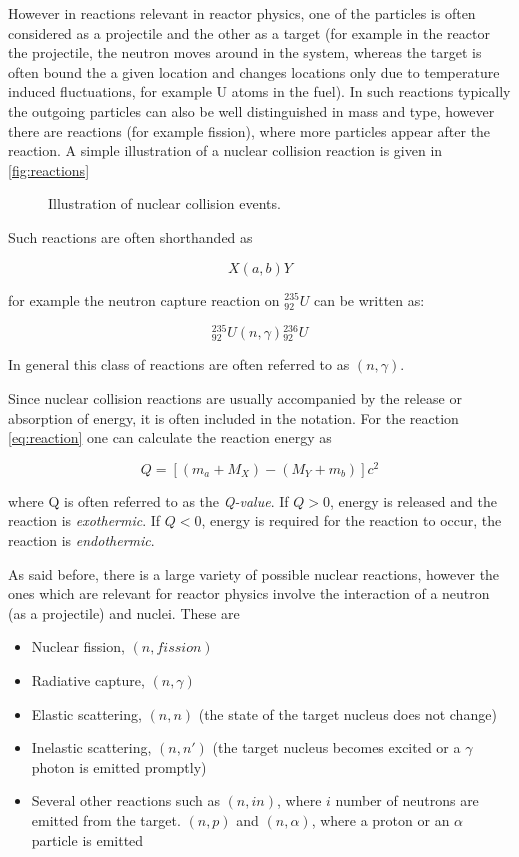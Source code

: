 However in reactions relevant in reactor physics, one of the particles is often considered as a projectile and the other as a target (for example in the reactor the projectile, the neutron moves around in the system, whereas the target is often bound the a given location and changes locations only due to temperature induced fluctuations, for example U atoms in the fuel). In such reactions typically the outgoing particles can also be well distinguished in mass and type, however there are reactions (for example fission), where more particles appear after the reaction. A simple illustration of a nuclear collision reaction is given in \autoref{fig:reactions}

\begin{figure}[ht!]
\protect {}\protect
\caption{\label{fig:reactions} \footnotesize{Illustration of nuclear collision events.}}
\end{figure}

Such reactions are often shorthanded as

\[
X(a,b)Y
\]

for example the neutron capture reaction on ${}_{92}^{235}U$ can be written as:

\[
{}_{92}^{235}U(n,\gamma){}_{92}^{236}U
\]

In general this class of reactions are often referred to as $(n,\gamma)$.

Since nuclear collision reactions are usually accompanied by the release or absorption of energy, it is often included in the notation. For the reaction \eqref{eq:reaction} one can calculate the reaction energy as

\begin{equation}\label{eq:reactionQ}
Q=[(m_a+M_X)-(M_Y+m_b)]c^2
\end{equation}

where Q is often referred to as the \textit{Q-value}. If $Q>0$, energy is released and the reaction is \textit{exothermic}. If $Q<0$, energy is required for the reaction to occur, the reaction is \textit{endothermic}.

As said before, there is a large variety of possible nuclear reactions, however the ones which are relevant for reactor physics involve the interaction of a neutron (as a projectile) and nuclei. These are

\begin{itemize}
\item Nuclear fission, $(n,fission)$
\item Radiative capture, $(n,\gamma)$
\item Elastic scattering, $(n,n)$ (the state of the target nucleus does not change)
\item Inelastic scattering, $(n,n')$ (the target nucleus becomes excited or a $\gamma$ photon is emitted promptly)
\item Several other reactions such as $(n,\textit{i}n)$, where $i$ number of neutrons are emitted from the target. $(n,p)$ and $(n,\alpha)$, where a proton or an $\alpha$ particle is emitted
\end{itemize}

